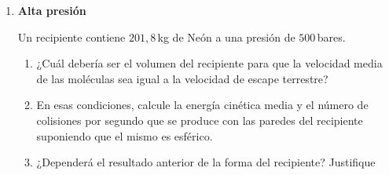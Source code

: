 \documentclass[a4paper,12pt]{article}
\begin{document}
\begin{enumerate}
	\item {\bf{Alta presión}}
	
		Un recipiente contiene $201,8$\,kg de Neón a una presión de $500$\,bares. 
		\begin{enumerate}
			\item ¿Cuál debería ser el volumen del recipiente para que la velocidad media de las moléculas sea igual a la velocidad de escape terrestre? 
			\item En esas condiciones, calcule la energía cinética media y el número de colisiones por segundo que se produce con las paredes del recipiente suponiendo que el mismo es esférico. 
			\item ¿Dependerá el resultado anterior de la forma del recipiente? Justifique
		\end{enumerate}
\end{enumerate}
\end{document}
